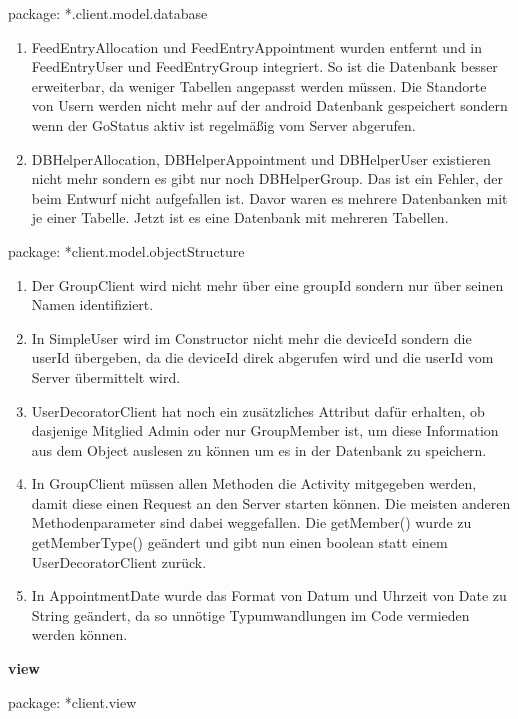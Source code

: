 package: *.client.model.database
\begin{enumerate}
	\item FeedEntryAllocation und FeedEntryAppointment wurden entfernt und in FeedEntryUser und FeedEntryGroup integriert. So ist die Datenbank besser erweiterbar, da weniger Tabellen angepasst werden müssen. Die Standorte von Usern werden nicht mehr auf der android Datenbank gespeichert sondern wenn der GoStatus aktiv ist regelmäßig vom Server abgerufen.
	\item DBHelperAllocation, DBHelperAppointment und DBHelperUser existieren nicht mehr sondern es gibt nur noch DBHelperGroup. Das ist ein Fehler, der beim Entwurf nicht aufgefallen ist. Davor waren es mehrere Datenbanken mit je einer Tabelle. Jetzt ist es eine Datenbank mit mehreren Tabellen.
\end{enumerate}

package: *client.model.objectStructure
\begin{enumerate}
	\item Der GroupClient wird nicht mehr über eine groupId sondern nur über seinen Namen identifiziert.
	\item In SimpleUser wird im Constructor nicht mehr die deviceId sondern die userId übergeben, da die deviceId direk abgerufen wird und die userId vom Server übermittelt wird.
	\item UserDecoratorClient hat noch ein zusätzliches Attribut dafür erhalten, ob dasjenige Mitglied Admin oder nur GroupMember ist, um diese Information aus dem Object auslesen zu können um es in der Datenbank zu speichern.
	\item In GroupClient müssen allen Methoden die Activity mitgegeben werden, damit diese einen Request an den Server starten können. Die meisten anderen Methodenparameter sind dabei weggefallen. Die getMember() wurde zu getMemberType() geändert und gibt nun einen boolean statt einem UserDecoratorClient zurück.
	\item In AppointmentDate wurde das Format von Datum und Uhrzeit von Date zu String geändert, da so unnötige Typumwandlungen im Code vermieden werden können.
\end{enumerate}


\textbf{view}

package: *client.view

